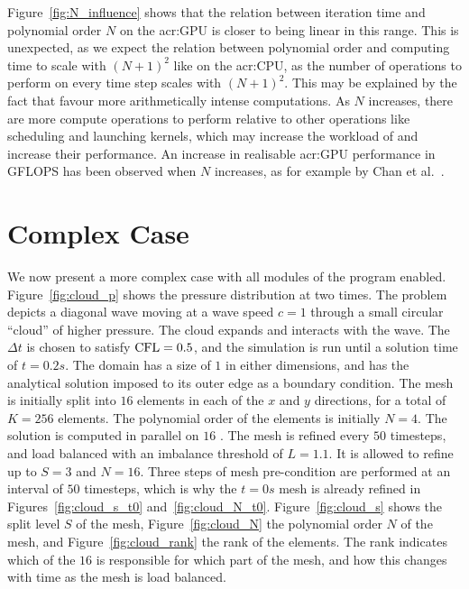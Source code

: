 Figure~\ref{fig:N_influence} shows that the relation between iteration time and polynomial order
\(N\) on the \acrshort{acr:GPU} is closer to being linear in this range. This is unexpected, as we
expect the relation between polynomial order and computing time to scale with \({\left( N + 1
\right)}^2\) like on the \acrshort{acr:CPU}, as the number of operations to perform on every time
step scales with \({\left( N + 1 \right)}^2\). This may be explained by the fact that
 favour more arithmetically intense computations. As \(N\) increases, there are
more compute operations to perform relative to other operations like scheduling and launching
kernels, which may increase the workload of  and increase their performance. An
increase in realisable \acrshort{acr:GPU} performance in GFLOPS has been observed when \(N\)
increases, as for example by Chan et al.~\cite{Chan2016}.

\section{Complex Case}\label{section:results:complex_application}

We now present a more complex case with all modules of the program enabled. Figure~\ref{fig:cloud_p}
shows the pressure distribution at two times. The problem depicts a diagonal wave moving at a wave
speed \(c = 1\) through a small circular ``cloud'' of higher pressure. The cloud expands and
interacts with the wave. The \(\Delta t\) is chosen to satisfy \(\operatorname{CFL} = 0.5\), and the simulation is
run until a solution time of \(t = 0.2 s\). The domain has a size of \(1\) in either dimensions, and
has the analytical solution imposed to its outer edge as a boundary condition. The mesh is initially
split into \(16\) elements in each of the \(x\) and \(y\) directions, for a total of \(K = 256\)
elements. The polynomial order of the elements is initially \(N = 4\). The solution is computed in
parallel on \(16\) . The mesh is refined every \(50\) timesteps, and load
balanced with an imbalance threshold of \(L = 1.1\). It is allowed to refine up to \(S = 3\) and \(N
= 16\). Three steps of mesh pre-condition are performed at an interval of \(50\) timesteps, which is
why the \(t = 0 s\) mesh is already refined in Figures~\ref{fig:cloud_s_t0}
and~\ref{fig:cloud_N_t0}. Figure~\ref{fig:cloud_s} shows the split level \(S\) of the mesh,
Figure~\ref{fig:cloud_N} the polynomial order \(N\) of the mesh, and Figure~\ref{fig:cloud_rank} the
rank of the elements. The rank indicates which of the \(16\)  is responsible for
which part of the mesh, and how this changes with time as the mesh is load balanced.

